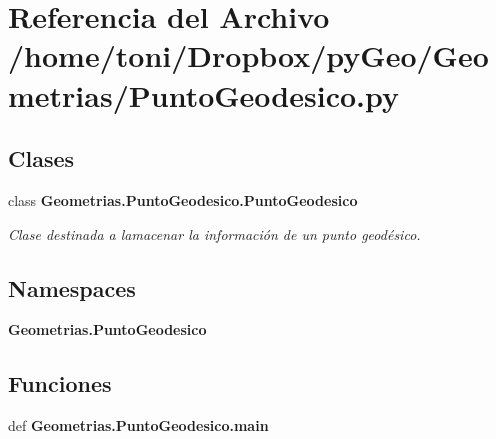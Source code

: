 \section{Referencia del Archivo /home/toni/\-Dropbox/py\-Geo/\-Geometrias/\-Punto\-Geodesico.py}
\label{PuntoGeodesico_8py}
\subsection*{Clases}
\begin{DoxyCompactItemize}
\item 
class {\bf Geometrias.\-Punto\-Geodesico.\-Punto\-Geodesico}
\begin{DoxyCompactList}\small\item\em Clase destinada a lamacenar la información de un punto geodésico. \end{DoxyCompactList}\end{DoxyCompactItemize}
\subsection*{Namespaces}
\begin{DoxyCompactItemize}
\item 
{\bf Geometrias.\-Punto\-Geodesico}
\end{DoxyCompactItemize}
\subsection*{Funciones}
\begin{DoxyCompactItemize}
\item 
def {\bf Geometrias.\-Punto\-Geodesico.\-main}
\end{DoxyCompactItemize}
